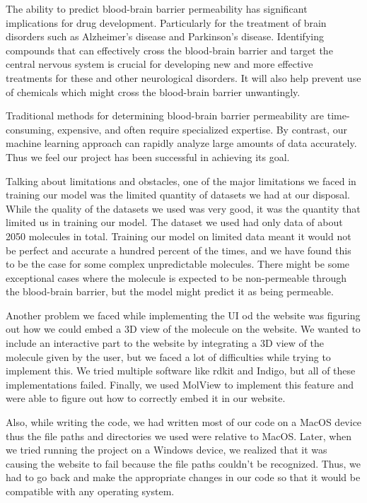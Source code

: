 \documentclass[fontsize=11pt]{article}
\begin{document}
The ability to predict blood-brain barrier permeability has significant implications for drug development. Particularly for the treatment of brain disorders such as Alzheimer's disease and Parkinson's disease. Identifying compounds that can effectively cross the blood-brain barrier and target the central nervous system is crucial for developing new and more effective treatments for these and other neurological disorders. It will also help prevent use of chemicals which might cross the blood-brain barrier unwantingly.

Traditional methods for determining blood-brain barrier permeability are time-consuming, expensive, and often require specialized expertise. By contrast, our machine learning approach can rapidly analyze large amounts of data accurately. Thus we feel our project has been successful in achieving its goal.

Talking about limitations and obstacles, one of the major limitations we faced in training our model was the limited quantity of datasets we had at our disposal. While the quality of the datasets we used was very good, it was the quantity that limited us in training our model. The dataset we used had only data of about 2050 molecules in total. Training our model on limited data meant it would not be perfect and accurate a hundred percent of the times, and we have found this to be the case for some complex unpredictable molecules. There might be some exceptional cases where the molecule is expected to be non-permeable through the blood-brain barrier, but the model might predict it as being permeable. 

Another problem we faced while implementing the UI od the website was figuring out how we could embed a 3D view of the molecule on the website. We wanted to include an interactive part to the website by integrating a 3D view of the molecule given by the user, but we faced a lot of difficulties while trying to implement this. We tried multiple software like rdkit and Indigo, but all of these implementations failed. Finally, we used MolView to implement this feature and were able to figure out how to correctly embed it in our website.

Also, while writing the code, we had written most of our code on a MacOS device thus the file paths and directories we used were relative to MacOS. Later, when we tried running the project on a Windows device, we realized that it was causing the website to fail because the file paths couldn’t be recognized. Thus, we had to go back and make the appropriate changes in our code so that it would be compatible with any operating system.
\end{document}
